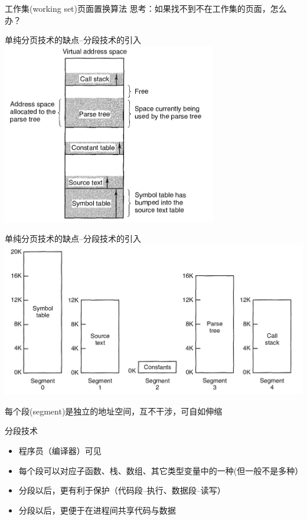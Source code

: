 \documentclass[xcolor=svgnames]{beamer}
\begin{document}
\begin{CJK*}{UTF8}{gbsn}
\begin{frame}{工作集(working set)页面置换算法}
思考：如果找不到不在工作集的页面，怎么办？
\end{frame}

\begin{frame}{单纯分页技术的缺点--分段技术的引入}
\includegraphics[width=0.7\textwidth]{noseg.png}
\end{frame}

\begin{frame}{单纯分页技术的缺点--分段技术的引入}
\includegraphics[width=1.0\textwidth]{seg.png}

每个段(segment)是独立的地址空间，互不干涉，可自如伸缩
\end{frame}

\begin{frame}{分段技术}
\begin{itemize}
\item 程序员（编译器）可见
\item 每个段可以对应子函数、栈、数组、其它类型变量中的一种(但一般不是多种）
\item 分段以后，更有利于保护（代码段--执行、数据段--读写）
\item 分段以后，更便于在进程间共享代码与数据
\end{itemize}
\end{frame}


\end{CJK*}
\end{document}
